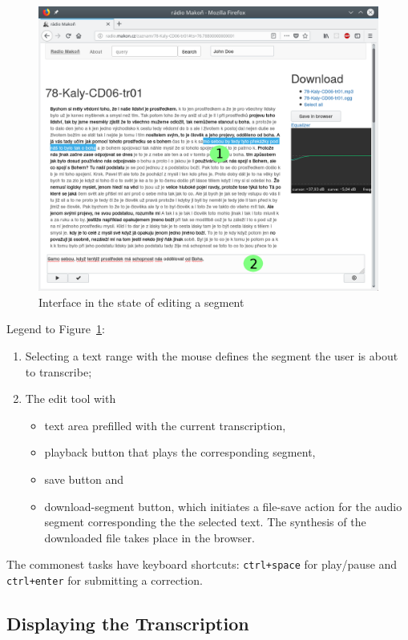 \documentclass{svproc}
\begin{document}
\begin{figure}[htpb]
\includegraphics[scale=0.6]{rc/radio-makon-en-2-lab.png}
\caption{Interface in the state of editing a segment}
\label{fig:scn2lab}
\end{figure}

Legend to Figure~\ref{fig:scn2lab}:
\begin{enumerate}
\item{
    Selecting a text range with the mouse defines the segment the user is about
    to transcribe;
}
\item{
    The edit tool with
    \begin{itemize}
    \item{text area prefilled with the current transcription,}
    \item{playback button that plays the corresponding segment,}
    \item{save button and}
    \item{download-segment button, which initiates a file-save action for the
    audio segment corresponding the the selected text. The synthesis of the
    downloaded file takes place in the browser.}
    \end{itemize}
}
\end{enumerate}

The commonest tasks have keyboard shortcuts: \texttt{ctrl+space} for
play/pause and \texttt{ctrl+enter} for submitting a correction.

\subsection{Displaying the Transcription}
\end{document}
